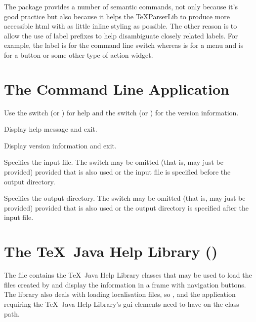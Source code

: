 \documentclass[toc=listof]{scrreport}
\begin{document}
The  package provides a number of semantic commands, not only
because it's good practice but also because it helps the \gls{TeXParserLib} to
produce more accessible \gls{html} with as little inline styling as possible.
The other reason is to allow the use of label prefixes to help disambiguate
closely related labels.  For example, the label  is for the
command line switch  whereas  is for a 
menu and  is for a  button or some other type of
action widget.

\chapter{The  Command Line Application}
\label{sec:texjavahelpmk}


Use the  switch 
(or ) for help and the
 switch
(or ) for the version information.

Display help message and exit.

Display version information and exit.

Specifies the input file. The switch may be omitted (that is,
 may just be provided) provided that
 is also used or the input file is specified before
the output directory.

Specifies the output directory. The switch may be omitted
(that is,  may just be provided) provided that
 is also used or the output directory is specified after
the input file.

\chapter{The \TeX\ Java Help Library ()}
\label{sec:texjavahelplib}

The  file contains the 
\TeX\ Java Help Library classes that may be used to load the
files created by  and display the information in
a frame with navigation buttons. The library also deals with loading
localisation files, so ,  and the
application requiring the \TeX\ Java Help Library's \gls{gui}
elements need to have  on the class path.
\end{document}
